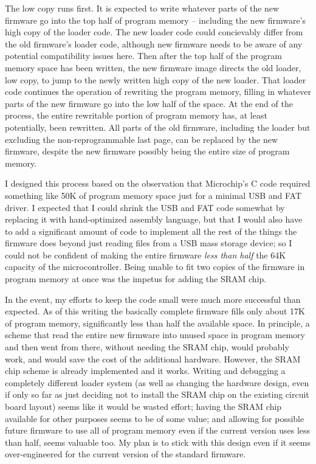 The low copy runs first.  It is expected to write whatever parts of the new
firmware go into the top half of program memory -- including the new
firmware's high copy of the loader code.  The new loader code could
concievably differ from the old firmware's loader code, although new
firmware needs to be aware of any potential compatibility issues here.  Then
after the top half of the program memory space has been written, the new
firmware image directs the old loader, low copy, to jump to the newly
written high copy of the new loader.  That loader code continues the
operation of rewriting the program memory, filling in whatever parts of the
new firmware go into the low half of the
space.  At the end of the process, the entire rewritable portion of program
memory has, at least potentially, been rewritten.  All parts of the old
firmware, including the loader but excluding the non-reprogrammable last
page, can be replaced by the new firmware, despite the new firmware possibly
being the entire size of program memory.

I designed this process based on the observation that Microchip's C code
required something like 50K of program memory space just for a minimal USB
and FAT driver.  I expected that I could shrink the USB and FAT code
somewhat by replacing it with hand-optimized assembly language, but that I
would also have to add a significant amount of code to implement all the
rest of the things the firmware does beyond just reading files from a USB
mass storage device; so I could not be confident of making the entire
firmware \emph{less than half} the 64K capacity of the microcontroller. 
Being unable to fit two copies of the firmware in program memory at once was
the impetus for adding the SRAM chip.

In the event, my efforts to keep the code small were much more successful
than expected.  As of this writing the basically complete firmware fills
only about 17K of program memory, significantly less than half the available
space.  In principle, a scheme that read the entire new firmware into unused
space in program memory and then went from there, without needing the SRAM
chip, would probably work, and would save the cost of the additional
hardware.  However, the SRAM chip scheme is already implemented and it
works.  Writing and debugging a completely different loader system (as well
as changing the hardware design, even if only so far as just deciding not to
install the SRAM chip on the existing circuit board layout) seems like it
would be wasted effort; having the SRAM chip available for other purposes
seems to be of some value; and allowing for possible future firmware to use
all of program memory even if the current version uses less than half, seems
valuable too.  My plan is to stick with this design even if it seems
over-engineered for the current version of the standard firmware.

